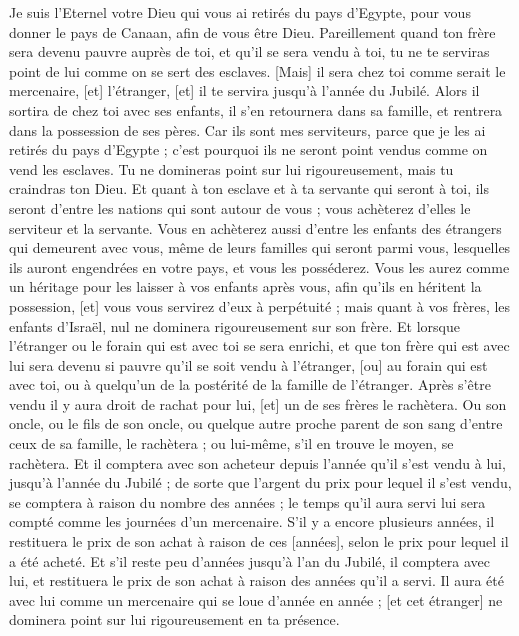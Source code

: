 \begin{multicols}{2}
Je suis l'Eternel votre Dieu qui vous ai retirés du pays d'Egypte, pour vous donner le pays de Canaan, afin de vous être Dieu.
Pareillement quand ton frère sera devenu pauvre auprès de toi, et qu'il se sera vendu à toi, tu ne te serviras point de lui comme on se sert des esclaves.
[Mais] il sera chez toi comme serait le mercenaire, [et] l'étranger, [et] il te servira jusqu'à l'année du Jubilé.
Alors il sortira de chez toi avec ses enfants, il s'en retournera dans sa famille, et rentrera dans la possession de ses pères.
Car ils sont mes serviteurs, parce que je les ai retirés du pays d'Egypte ; c'est pourquoi ils ne seront point vendus comme on vend les esclaves.
Tu ne domineras point sur lui rigoureusement, mais tu craindras ton Dieu.
Et quant à ton esclave et à ta servante qui seront à toi, ils seront d'entre les nations qui sont autour de vous ; vous achèterez d'elles le serviteur et la servante.
Vous en achèterez aussi d'entre les enfants des étrangers qui demeurent avec vous, même de leurs familles qui seront parmi vous, lesquelles ils auront engendrées en votre pays, et vous les posséderez.
Vous les aurez comme un héritage pour les laisser à vos enfants après vous, afin qu'ils en héritent la possession, [et] vous vous servirez d'eux à perpétuité ; mais quant à vos frères, les enfants d'Israël, nul ne dominera rigoureusement sur son frère.
Et lorsque l'étranger ou le forain qui est avec toi se sera enrichi, et que ton frère qui est avec lui sera devenu si pauvre qu'il se soit vendu à l'étranger, [ou] au forain qui est avec toi, ou à quelqu'un de la postérité de la famille de l'étranger.
Après s'être vendu il y aura droit de rachat pour lui, [et] un de ses frères le rachètera.
Ou son oncle, ou le fils de son oncle, ou quelque autre proche parent de son sang d'entre ceux de sa famille, le rachètera ; ou lui-même, s'il en trouve le moyen, se rachètera.
Et il comptera avec son acheteur depuis l'année qu'il s'est vendu à lui, jusqu'à l'année du Jubilé ; de sorte que l'argent du prix pour lequel il s'est vendu, se comptera à raison du nombre des années ; le temps qu'il aura servi lui sera compté comme les journées d'un mercenaire.
S'il y a encore plusieurs années, il restituera le prix de son achat à raison de ces [années], selon le prix pour lequel il a été acheté.
Et s'il reste peu d'années jusqu'à l'an du Jubilé, il comptera avec lui, et restituera le prix de son achat à raison des années qu'il a servi.
Il aura été avec lui comme un mercenaire qui se loue d'année en année ; [et cet étranger] ne dominera point sur lui rigoureusement en ta présence.

\end{multicols}
